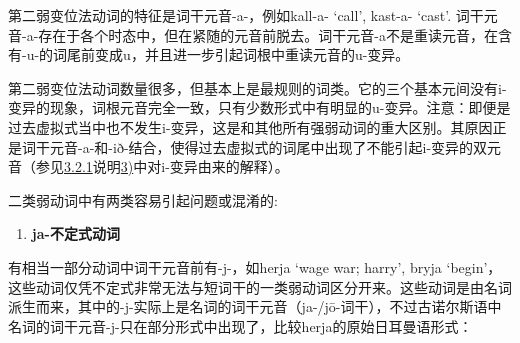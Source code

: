 第二弱变位法动词的特征是词干元音-a-，例如kall-a- `call‌', kast-a- `cast‌'.
词干元音-a-存在于各个时态中，但在紧随的元音前脱去。词干元音-a不是重读元音，在含有-u-的词尾前变成u，并且进一步引起词根中重读元音的u-变异。

第二弱变位法动词数量很多，但基本上是最规则的词类。它的三个基本元间没有i-变异的现象，词根元音完全一致，只有少数形式中有明显的u-变异。注意：即便是过去虚拟式当中也不发生i-变异，这是和其他所有强弱动词的重大区别。其原因正是词干元音-a-和-ið-结合，使得过去虚拟式的词尾中出现了不能引起i-变异的双元音（参见\hyperref[ux5f3aux52a8ux8bcdux7684ux4e3bux52a8ux8bcdux5c3e]{3.2.1}说明\hyperref[_Ref116919964]{3)}中对i-变异由来的解释）。

二类弱动词中有两类容易引起问题或混淆的:

\begin{enumerate}
  \def\labelenumi{\arabic{enumi})}
  \item
        \textbf{ja-不定式动词}
\end{enumerate}

有相当一部分动词中词干元音前有-j-，如herja `wage war; harry', bryja
`begin'，这些动词仅凭不定式非常无法与短词干的一类弱动词区分开来。这些动词是由名词派生而来，其中的-j-实际上是名词的词干元音（ja-/jō-词干），不过古诺尔斯语中名词的词干元音-j-只在部分形式中出现了，比较herja的原始日耳曼语形式：

